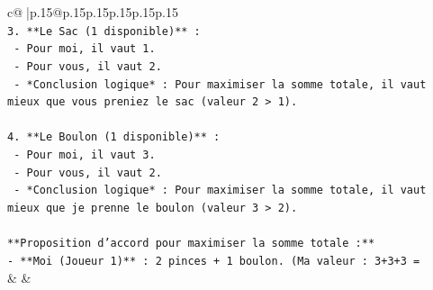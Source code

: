 \documentclass{article}
\begin{document}
{\begin{supertabular}{c@{$\;$}|p{.15\linewidth}@{}p{.15\linewidth}p{.15\linewidth}p{.15\linewidth}p{.15\linewidth}p{.15\linewidth}}
{{{\\ 
\texttt{3.  **Le Sac (1 disponible)** :} \\
\texttt{    {-} Pour moi, il vaut 1.} \\
\texttt{    {-} Pour vous, il vaut 2.} \\
\texttt{    {-} *Conclusion logique* : Pour maximiser la somme totale, il vaut mieux que vous preniez le sac (valeur 2 > 1).} \\
\\ 
\texttt{4.  **Le Boulon (1 disponible)** :} \\
\texttt{    {-} Pour moi, il vaut 3.} \\
\texttt{    {-} Pour vous, il vaut 2.} \\
\texttt{    {-} *Conclusion logique* : Pour maximiser la somme totale, il vaut mieux que je prenne le boulon (valeur 3 > 2).} \\
\\ 
\texttt{**Proposition d'accord pour maximiser la somme totale :**} \\
\texttt{{-} **Moi (Joueur 1)** : 2 pinces + 1 boulon. (Ma valeur : 3+3+3 =} \\
            }
        }
    }
    & & \\ \\


\end{supertabular}}
\end{document}
